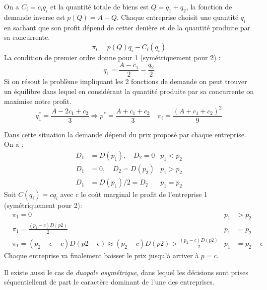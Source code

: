 \begin{tcolorbox}[title=Duopole de Cournot]
	
	On a $C_i=c_iq_i$ et la quantité totale de biens est $Q=q_1+q_2$, la fonction de demande inverse est $p(Q)=A-Q$.
	Chaque entreprise choisit une quantité $q_i$ en sachant que son profit dépend de cetter denière et de la quantité produite par sa concurrente.
	\[
		\pi_i = p(Q)q_i-C_i(q_i)
	\]
	La condition de premier ordre donne pour 1 (symétriquement pour 2) :
	\[
		q_1 = \frac{A-c_1}{2}-\frac{q_2}{2}
	\]
	Si on résout le problème impliquant les 2 fonctions de demande on peut trouver un équilibre dans lequel en considérant la quantité produite par sa concurrente on maximise notre profit.
	\[
		q_1^* = \frac{A-2c_1+c_2}{3} \Rightarrow p^* = \frac{A+c_1+c_2}{3} \quad \pi_i= \frac{(A+c_1+c_2)^2}{9}
	\]
	
\end{tcolorbox}

\begin{tcolorbox}[title=Duopole de Bertrand]
	
	Dans cette situation la demande dépend du prix proposé par chaque entreprise. On a : 
	\begin{align*}
		D_1 &= D(p_1), \quad D_2=0  &p_1<p_2 \\
		D_1 &= 0, \quad D_2 = D(p_2)  &p_1>p_2 \\
		D_1 &= D(p_1)/2 = D_2 &p_1=p_2
	\end{align*}
	Soit $C(q_i)=cq_i$ avec c le coût marginal le profit de l'entreprise 1 (symétriquement pour 2):
	\begin{align*}
		&\pi_1=0  &p_1&>p_2 \\
		&\pi_1 = \frac{(p_2-c)D(p2)}{2} &p_1&=p_2 \\
		&\pi_1= (p_2-\epsilon-c)D(p2-\epsilon) \approx (p_2-c)D(p2)> \frac{(p_2-c)D(p2)}{2} &p_1&=p_2-\epsilon
	\end{align*}
	Chaque entreprise va finalement baisser le prix jusqu'à arriver à $p=c$.
	
\end{tcolorbox}

Il existe aussi le cas de \emph{duopole asymétrique}, dans lequel les décisions sont prises séquentiellemt de part le caractère dominant de l'une des entreprises.

